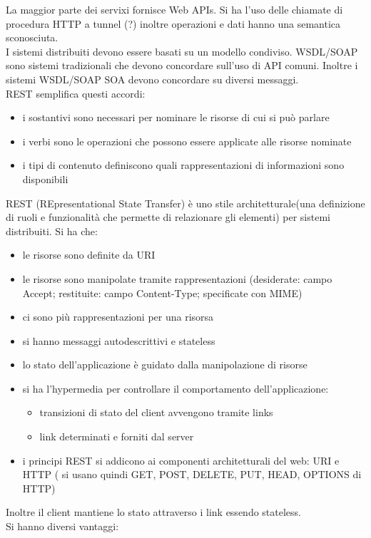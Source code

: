 \documentclass[a4paper,12pt, oneside]{book}
\begin{document}
La maggior parte dei servixi fornisce Web APIs. Si ha l'uso delle chiamate di procedura HTTP a tunnel (?) inoltre operazioni e dati hanno una semantica sconosciuta. \\
I sistemi distribuiti devono essere basati su un modello condiviso. WSDL/SOAP sono sistemi tradizionali che devono concordare sull'uso di API comuni. Inoltre i sistemi WSDL/SOAP SOA devono concordare su diversi messaggi.\\
REST semplifica questi accordi:
\begin{itemize}
\item i sostantivi sono necessari per nominare le risorse di cui si può parlare
\item i verbi sono le operazioni che possono essere applicate alle risorse nominate
\item i tipi di contenuto definiscono quali rappresentazioni di informazioni sono disponibili
\end{itemize}
REST (REpresentational State Transfer) è uno stile architetturale(una definizione di ruoli e funzionalità che permette di relazionare gli elementi) per sistemi distribuiti. Si ha che:
\begin{itemize}
\item le risorse sono definite da URI
\item le risorse sono manipolate tramite rappresentazioni (desiderate: campo Accept; restituite: campo Content-Type; specificate con MIME)
\item ci sono più rappresentazioni per una risorsa
\item si hanno messaggi autodescrittivi e stateless
\item lo stato dell'applicazione è guidato dalla manipolazione di risorse
\item si ha l'hypermedia per controllare il comportamento dell'applicazione:
  \begin{itemize}
    \item transizioni di stato del client avvengono tramite links
    \item link determinati e forniti dal server
  \end{itemize}
\item i principi REST si addicono ai componenti architetturali del web: URI e HTTP ( si usano quindi GET, POST, DELETE, PUT, HEAD, OPTIONS di HTTP)
\end{itemize}
Inoltre il client mantiene lo stato attraverso i link essendo stateless.\\
Si hanno diversi vantaggi:
\end{document}
